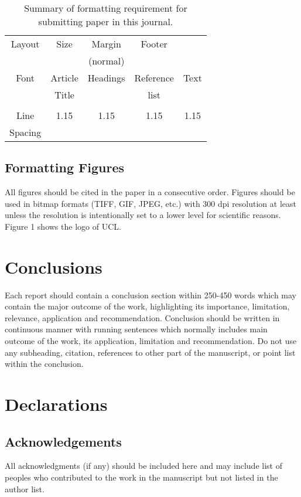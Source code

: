 \documentclass[11pt,twocolumn]{article}
\begin{document}
\begin{table}
\caption{Summary of formatting requirement for submitting paper in this journal.}

\begin{tabular}{|c|c|c|c|c|} \hline
Layout	& Size&	Margin  &	Footer &	 \\ 
 	&  &	(normal) &	 &	 \\  \hline
Font &	Article 	&Headings	&Reference	&Text \\ 
 &	Title	& 	& list	& \\ \hline
& & & & \\				\hline
Line  &	1.15	&1.15&	1.15	&1.15 \\ \hline
 Spacing &		&  &		&  \\ \hline
\end{tabular}
\end{table}


\subsection{Formatting Figures}
All figures should be cited in the paper in a consecutive order. Figures should be used in bitmap formats (TIFF, GIF, JPEG, etc.) with 300 dpi resolution at least unless the resolution is intentionally set to a lower level for scientific reasons. Figure 1 shows the logo of UCL.

 

\section{Conclusions}

Each report should contain a conclusion section within 250-450 words which may contain the major outcome of the work, highlighting its importance, limitation, relevance, application and recommendation. Conclusion should be written in continuous manner with running sentences which normally includes main outcome of the work, its application, limitation and recommendation. Do not use any subheading, citation, references to other part of the manuscript, or point list within the conclusion.

\section{Declarations}
\subsection{Acknowledgements}
All acknowledgments (if any) should be included here and may include list of peoples who contributed to the work in the manuscript but not listed in the author list. 
\cite{groisser2019geometry}




\end{document}
